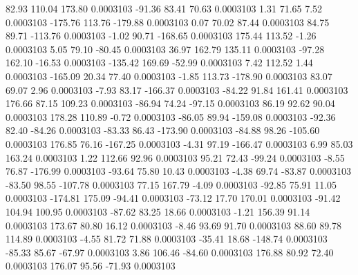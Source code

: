        82.93      110.04      173.80     0.0003103
      -91.36       83.41       70.63     0.0003103
        1.31       71.65        7.52     0.0003103
     -175.76      113.76     -179.88     0.0003103
        0.07       70.02       87.44     0.0003103
       84.75       89.71     -113.76     0.0003103
       -1.02       90.71     -168.65     0.0003103
      175.44      113.52       -1.26     0.0003103
        5.05       79.10      -80.45     0.0003103
       36.97      162.79      135.11     0.0003103
      -97.28      162.10      -16.53     0.0003103
     -135.42      169.69      -52.99     0.0003103
        7.42      112.52        1.44     0.0003103
     -165.09       20.34       77.40     0.0003103
       -1.85      113.73     -178.90     0.0003103
       83.07       69.07        2.96     0.0003103
       -7.93       83.17     -166.37     0.0003103
      -84.22       91.84      161.41     0.0003103
      176.66       87.15      109.23     0.0003103
      -86.94       74.24      -97.15     0.0003103
       86.19       92.62       90.04     0.0003103
      178.28      110.89       -0.72     0.0003103
      -86.05       89.94     -159.08     0.0003103
      -92.36       82.40      -84.26     0.0003103
      -83.33       86.43     -173.90     0.0003103
      -84.88       98.26     -105.60     0.0003103
      176.85       76.16     -167.25     0.0003103
       -4.31       97.19     -166.47     0.0003103
        6.99       85.03      163.24     0.0003103
        1.22      112.66       92.96     0.0003103
       95.21       72.43      -99.24     0.0003103
       -8.55       76.87     -176.99     0.0003103
      -93.64       75.80       10.43     0.0003103
       -4.38       69.74      -83.87     0.0003103
      -83.50       98.55     -107.78     0.0003103
       77.15      167.79       -4.09     0.0003103
      -92.85       75.91       11.05     0.0003103
     -174.81      175.09      -94.41     0.0003103
      -73.12       17.70      170.01     0.0003103
      -91.42      104.94      100.95     0.0003103
      -87.62       83.25       18.66     0.0003103
       -1.21      156.39       91.14     0.0003103
      173.67       80.80       16.12     0.0003103
       -8.46       93.69       91.70     0.0003103
       88.60       89.78      114.89     0.0003103
       -4.55       81.72       71.88     0.0003103
      -35.41       18.68     -148.74     0.0003103
      -85.33       85.67      -67.97     0.0003103
        3.86      106.46      -84.60     0.0003103
      176.88       80.92       72.40     0.0003103
      176.07       95.56      -71.93     0.0003103

